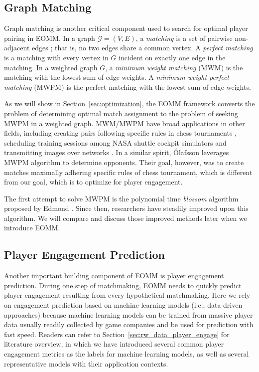 \subsection{Graph Matching}
Graph matching is another critical component used to search for optimal player pairing in EOMM. In a graph $\mathcal{G}=(V, E)$, a \textit{matching} is a set of pairwise non-adjacent edges \cite{west2001introduction}; that is, no two edges share a common vertex. A \textit{perfect matching} is a matching with every vertex in $G$ incident on exactly one edge in the matching.  In a weighted graph $G$, a \textit{minimum weight matching } (MWM) is the matching with the lowest sum of edge weights. A \textit{minimum weight perfect matching} (MWPM) is the perfect matching with the lowest sum of edge weights.

As we will show in Section~\ref{sec:optimization}, the EOMM framework converts the problem of determining optimal match assignment to the problem of seeking MWPM in a weighted graph. MWM/MWPM have broad applications in other fields, including creating pairs following specific rules in chess tournaments \cite{olafsson1990weighted}, scheduling training sessions among NASA shuttle cockpit simulators \cite{bell1994weighted} and transmitting images over networks \cite{riskin1994index}. In a similar spirit, \'{O}lafsson \cite{olafsson1990weighted} leverages MWPM algorithm to determine opponents. Their goal, however, was to create matches maximally adhering specific rules of chess tournament, which is different from our goal, which is to optimize for player engagement.

The first attempt to solve MWPM is the polynomial time \textit{blossom} algorithm proposed by Edmond \cite{edmonds1965maximum,edmonds1965paths}. Since then, researchers have steadily improved upon this algorithm. We will compare and discuss those improved methods later when we introduce EOMM.

\subsection{Player Engagement Prediction}
Another important building component of EOMM is player engagement prediction. During one step of matchmaking, EOMM needs to quickly predict player engagement resulting from every hypothetical matchmaking. Here we rely on engagement prediction based on machine learning models (i.e., data-driven approaches) because machine learning models can be trained from massive player data usually readily collected by game companies and be used for prediction with fast speed. Readers can refer to Section~\ref{sec:rw_data_player_engage} for literature overview, in which we have introduced several common player engagement metrics as the labels for machine learning models, as well as several representative models with their application contexts.

